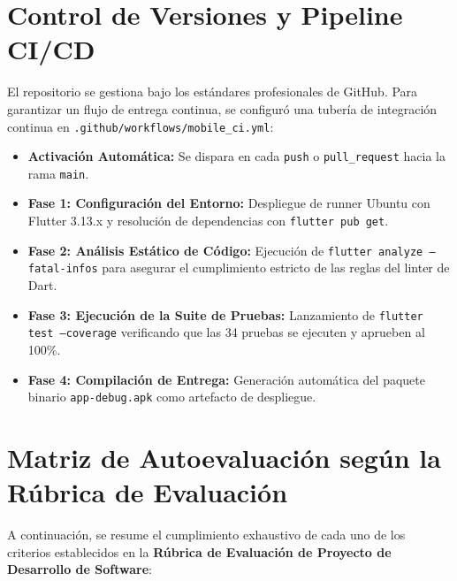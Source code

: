 \documentclass[12pt,a4paper]{article}
\begin{document}
\section{Control de Versiones y Pipeline CI/CD}

El repositorio se gestiona bajo los estándares profesionales de GitHub. Para garantizar un flujo de entrega continua, se configuró una tubería de integración continua en \texttt{.github/workflows/mobile\_ci.yml}:

\begin{itemize}[leftmargin=*]
    \item \textbf{Activación Automática:} Se dispara en cada \texttt{push} o \texttt{pull\_request} hacia la rama \texttt{main}.
    \item \textbf{Fase 1: Configuración del Entorno:} Despliegue de runner Ubuntu con Flutter 3.13.x y resolución de dependencias con \texttt{flutter pub get}.
    \item \textbf{Fase 2: Análisis Estático de Código:} Ejecución de \texttt{flutter analyze --fatal-infos} para asegurar el cumplimiento estricto de las reglas del linter de Dart.
    \item \textbf{Fase 3: Ejecución de la Suite de Pruebas:} Lanzamiento de \texttt{flutter test --coverage} verificando que las 34 pruebas se ejecuten y aprueben al 100\%.
    \item \textbf{Fase 4: Compilación de Entrega:} Generación automática del paquete binario \texttt{app-debug.apk} como artefacto de despliegue.
\end{itemize}

\section{Matriz de Autoevaluación según la Rúbrica de Evaluación}

A continuación, se resume el cumplimiento exhaustivo de cada uno de los criterios establecidos en la \textbf{Rúbrica de Evaluación de Proyecto de Desarrollo de Software}:
\end{document}
